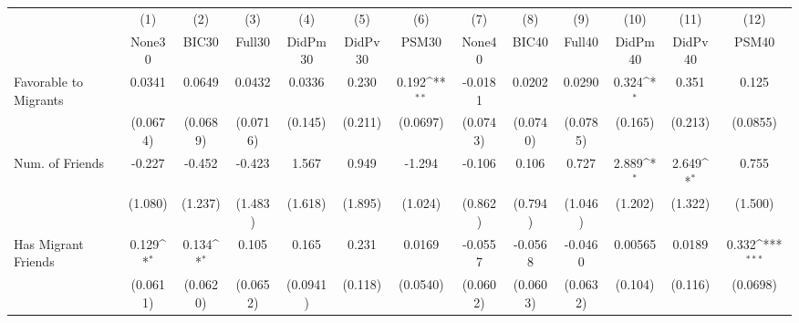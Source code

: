 {
\def\sym#1{\ifmmode^{#1}\else\(^{#1}\)\fi}
\begin{tabular}{l*{12}{c}}
\toprule
            &\multicolumn{1}{c}{(1)}&\multicolumn{1}{c}{(2)}&\multicolumn{1}{c}{(3)}&\multicolumn{1}{c}{(4)}&\multicolumn{1}{c}{(5)}&\multicolumn{1}{c}{(6)}&\multicolumn{1}{c}{(7)}&\multicolumn{1}{c}{(8)}&\multicolumn{1}{c}{(9)}&\multicolumn{1}{c}{(10)}&\multicolumn{1}{c}{(11)}&\multicolumn{1}{c}{(12)}\\
            &\multicolumn{1}{c}{None30}&\multicolumn{1}{c}{BIC30}&\multicolumn{1}{c}{Full30}&\multicolumn{1}{c}{DidPm30}&\multicolumn{1}{c}{DidPv30}&\multicolumn{1}{c}{PSM30}&\multicolumn{1}{c}{None40}&\multicolumn{1}{c}{BIC40}&\multicolumn{1}{c}{Full40}&\multicolumn{1}{c}{DidPm40}&\multicolumn{1}{c}{DidPv40}&\multicolumn{1}{c}{PSM40}\\
\midrule
Favorable to Migrants&      0.0341         &      0.0649         &      0.0432         &      0.0336         &       0.230         &       0.192\sym{**} &     -0.0181         &      0.0202         &      0.0290         &       0.324\sym{*}  &       0.351         &       0.125         \\
            &    (0.0674)         &    (0.0689)         &    (0.0716)         &     (0.145)         &     (0.211)         &    (0.0697)         &    (0.0743)         &    (0.0740)         &    (0.0785)         &     (0.165)         &     (0.213)         &    (0.0855)         \\
\addlinespace
Num. of Friends&      -0.227         &      -0.452         &      -0.423         &       1.567         &       0.949         &      -1.294         &      -0.106         &       0.106         &       0.727         &       2.889\sym{*}  &       2.649\sym{*}  &       0.755         \\
            &     (1.080)         &     (1.237)         &     (1.483)         &     (1.618)         &     (1.895)         &     (1.024)         &     (0.862)         &     (0.794)         &     (1.046)         &     (1.202)         &     (1.322)         &     (1.500)         \\
\addlinespace
Has Migrant Friends&       0.129\sym{*}  &       0.134\sym{*}  &       0.105         &       0.165         &       0.231         &      0.0169         &     -0.0557         &     -0.0568         &     -0.0460         &     0.00565         &      0.0189         &       0.332\sym{***}\\
            &    (0.0611)         &    (0.0620)         &    (0.0652)         &    (0.0941)         &     (0.118)         &    (0.0540)         &    (0.0602)         &    (0.0603)         &    (0.0632)         &     (0.104)         &     (0.116)         &    (0.0698)         \\

\end{tabular}}
